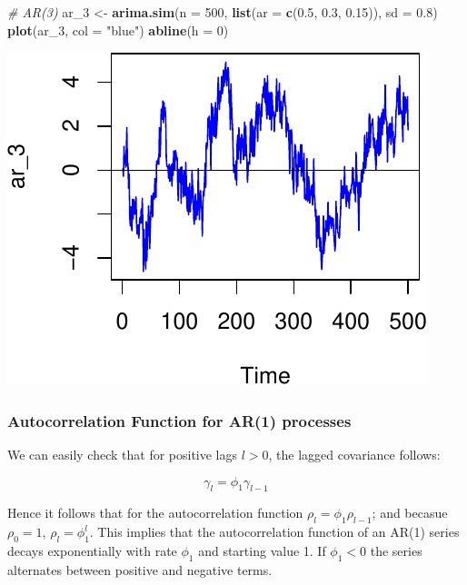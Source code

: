 \documentclass[11pt,]{article}
\newenvironment{Shaded}{\begin{snugshade}}{\end{snugshade}}
\newcommand{\KeywordTok}[1]{\textcolor[rgb]{0.13,0.29,0.53}{\textbf{#1}}}
\newcommand{\DataTypeTok}[1]{\textcolor[rgb]{0.13,0.29,0.53}{#1}}
\newcommand{\DecValTok}[1]{\textcolor[rgb]{0.00,0.00,0.81}{#1}}
\newcommand{\FloatTok}[1]{\textcolor[rgb]{0.00,0.00,0.81}{#1}}
\newcommand{\StringTok}[1]{\textcolor[rgb]{0.31,0.60,0.02}{#1}}
\newcommand{\CommentTok}[1]{\textcolor[rgb]{0.56,0.35,0.01}{\textit{#1}}}
\newcommand{\NormalTok}[1]{#1}
\begin{document}
\begin{Shaded}
\begin{Highlighting}[]
\CommentTok{# AR(3)}
\NormalTok{ar_}\DecValTok{3}\NormalTok{ <-}\StringTok{ }\KeywordTok{arima.sim}\NormalTok{(}\DataTypeTok{n =} \DecValTok{500}\NormalTok{, }\KeywordTok{list}\NormalTok{(}\DataTypeTok{ar =} \KeywordTok{c}\NormalTok{(}\FloatTok{0.5}\NormalTok{, }\FloatTok{0.3}\NormalTok{, }\FloatTok{0.15}\NormalTok{)), }\DataTypeTok{sd =} \FloatTok{0.8}\NormalTok{)}
\KeywordTok{plot}\NormalTok{(ar_}\DecValTok{3}\NormalTok{, }\DataTypeTok{col =} \StringTok{"blue"}\NormalTok{)}
\KeywordTok{abline}\NormalTok{(}\DataTypeTok{h =} \DecValTok{0}\NormalTok{)}
\end{Highlighting}
\end{Shaded}

\begin{center}\includegraphics{FMC_T4_PhD_ARMA_GARCH_files/figure-latex/arima_sim-4} \end{center}

\subsubsection{Autocorrelation Function for AR(1)
processes}\label{autocorrelation-function-for-ar1-processes}

We can easily check that for positive lags \(l>0\), the lagged
covariance follows:

\[\gamma_l = \phi_1\gamma_{l-1}\]

Hence it follows that for the autocorrelation function
\(\rho_l = \phi_1\rho_{l-1}\); and becasue \(\rho_0=1\),
\(\rho_l = \phi_1^l\). This implies that the autocorrelation function of
an AR(1) series decays exponentially with rate \(\phi_1\) and starting
value 1. If \(\phi_1<0\) the series alternates between positive and
negative terms.
\end{document}
